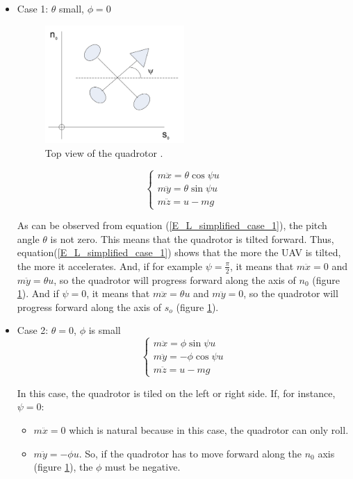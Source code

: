 \documentclass{thesisreport}
\begin{document}
\begin{itemize}
	\item Case 1: $\theta$ small, $\phi=0$
	
	
\begin{figure}[h]
\centering
\includegraphics[width=0.5\textwidth]{Images/Modeling/Fantoni_c}
\caption{Top view of the quadrotor \cite{Fantoni2016}.}
\label{Fantoni_c}
\end{figure}	
	
	\begin{equation}\label{E_L_simplified_case_1}
	\begin{cases}
	m \ddot{x} = \theta \cos \psi u \\
	m \ddot{y} = \theta \sin \psi u \\
	m \ddot{z} = u - mg 
	\end{cases}
	\end{equation}
	
	As can be observed from equation (\ref{E_L_simplified_case_1}), the pitch angle $\theta$ is not zero. This means that the quadrotor is tilted forward. Thus, equation(\ref{E_L_simplified_case_1}) shows that the more the UAV is tilted, the more it accelerates. And, if for example $\psi=\frac{\pi}{2}$, it means that $m \ddot{x}=0$ and $m\ddot{y}=\theta u$, so the quadrotor will progress forward along the axis of $n_0$ (figure \ref{Fantoni_c}).  And if $\psi = 0$, it means that $m\ddot{x}= \theta u$ and $m\ddot{y}=0$, so the quadrotor will progress forward along the axis of $s_o$ (figure \ref{Fantoni_c}).
	
	\item Case 2: $\theta=0$, $\phi$ is small
	\begin{equation}\label{E_L_simplified_case_3}
	\begin{cases}
	m \ddot{x} = \phi \sin \psi u \\
	m \ddot{y} = -\phi \cos \psi u \\
	m \ddot{z} = u - mg 
	\end{cases}
	\end{equation}	
	
	In this case, the quadrotor is tiled on the left or right side. If, for instance, $\psi=0$:
	
	\begin{itemize}
		\item $m\ddot{x}=0$ which is natural because in this case, the quadrotor can only roll.
		\item $m\ddot{y}=-\phi u$. So, if the quadrotor has to move forward along the $n_0$ axis (figure \ref{Fantoni_c}), the $\phi$ must be negative.
	\end{itemize}
\end{itemize}
\end{document}
